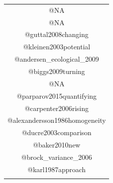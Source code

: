\documentclass[12pt,twoside,openany]{reedthesis}
\begin{document}
\begin{longtable}[]{@{}c@{}}
\begin{minipage}[t]{0.44\columnwidth}
@NA\strut
\end{minipage}\tabularnewline
\begin{minipage}[t]{0.44\columnwidth}\centering\strut
@NA\strut
\end{minipage}\tabularnewline
\begin{minipage}[t]{0.44\columnwidth}\centering\strut
@guttal2008changing\strut
\end{minipage}\tabularnewline
\begin{minipage}[t]{0.44\columnwidth}\centering\strut
@kleinen2003potential\strut
\end{minipage}\tabularnewline
\begin{minipage}[t]{0.44\columnwidth}\centering\strut
@andersen\_ecological\_2009\strut
\end{minipage}\tabularnewline
\begin{minipage}[t]{0.44\columnwidth}\centering\strut
@biggs2009turning\strut
\end{minipage}\tabularnewline
\begin{minipage}[t]{0.44\columnwidth}\centering\strut
@NA\strut
\end{minipage}\tabularnewline
\begin{minipage}[t]{0.44\columnwidth}\centering\strut
@parparov2015quantifying\strut
\end{minipage}\tabularnewline
\begin{minipage}[t]{0.44\columnwidth}\centering\strut
@carpenter2006rising\strut
\end{minipage}\tabularnewline
\begin{minipage}[t]{0.44\columnwidth}\centering\strut
@alexandersson1986homogeneity\strut
\end{minipage}\tabularnewline
\begin{minipage}[t]{0.44\columnwidth}\centering\strut
@ducre2003comparison\strut
\end{minipage}\tabularnewline
\begin{minipage}[t]{0.44\columnwidth}\centering\strut
@baker2010new\strut
\end{minipage}\tabularnewline
\begin{minipage}[t]{0.44\columnwidth}\centering\strut
@brock\_variance\_2006\strut
\end{minipage}\tabularnewline
\begin{minipage}[t]{0.44\columnwidth}\centering\strut
@karl1987approach\strut
\end{minipage}\tabularnewline
\begin{minipage}[t]{0.44\columnwidth}\centering\strut

\end{minipage}
\end{longtable}
\end{document}
